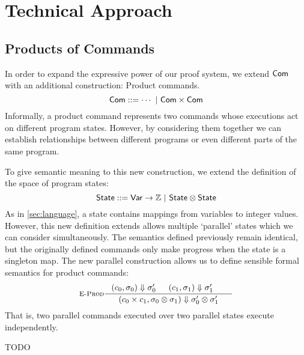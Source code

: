 \documentclass[p.tex]{subfiles}
\begin{document}
\section{Technical Approach}\label{sec:approach}
\subsection{Products of Commands}\label{sec:product-com}
In order to expand the expressive power of our proof system, we extend
$\textsf{Com}$ with an additional construction: Product commands.
\[ \textsf{Com} ::= \cdots~|~\textsf{Com}\times\textsf{Com} \]
Informally,
a product command represents two commands whose executions act on
different program states. However, by considering them together we can
establish relationships between different programs or even different
parts of the same program.

To give semantic meaning to this new construction, we extend the
definition of the space of program states:
\[\textsf{State} ::= \textsf{Var} \rightarrow \mathbb{Z}~|~\textsf{State}\otimes\textsf{State}\]
As in \cref{sec:language}, a state contains mappings from variables to integer
values. However, this new definition extends allows multiple
`parallel' states which we can consider simultaneously. The semantics
defined previously remain identical, but the originally defined
commands only make progress when the state is a singleton map. The new
parallel construction allows us to define sensible formal semantics for
product commands:
\begin{align*}
  \inference[\textsc{E-Prod}]{%
    \ceval{c_0}{\sigma_0}{\sigma_0'}&
    \ceval{c_1}{\sigma_1}{\sigma_1'}&
  }{%
    \ceval{\cprod{c_0}{c_1}}{\sprod{\sigma_0}{\sigma_1}}{\sprod{\sigma_0'}{\sigma_1'}}
  }
\end{align*}
That is, two parallel commands executed over two parallel states
execute independently.

TODO
\end{document}
